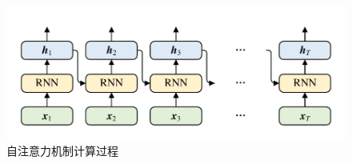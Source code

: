 \begin{figure}[htb]
	\centering
	\includegraphics[page=7, width=0.55\linewidth]{images/structure.pdf}
	\caption{自注意力机制计算过程}
	\label{fig:SelfAttention}
\end{figure}